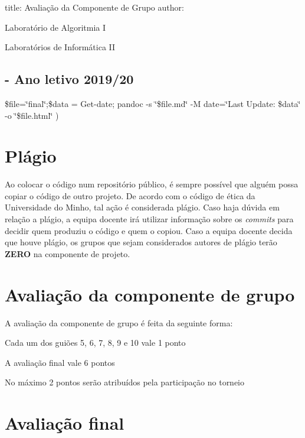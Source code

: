 

 title\+: Avaliação da Componente de Grupo author\+:
\begin{DoxyItemize}
\item Laboratório de Algoritmia I
\item Laboratórios de Informática II \subsection*{-\/ Ano letivo 2019/20 }
\end{DoxyItemize}

\$file=\char`\"{}final\char`\"{};\$data = Get-\/date; pandoc -\/s \char`\"{}\$file.\+md\char`\"{} -\/M date=\char`\"{}\+Last Update\+: \$data\char`\"{} -\/o \char`\"{}\$file.\+html\char`\"{} )

\section*{Plágio}

Ao colocar o código num repositório público, é sempre possível que alguém possa copiar o código de outro projeto. De acordo com o código de ética da Universidade do Minho, tal ação é considerada plágio. Caso haja dúvida em relação a plágio, a equipa docente irá utilizar informação sobre os {\itshape commits} para decidir quem produziu o código e quem o copiou. Caso a equipa docente decida que houve plágio, os grupos que sejam considerados autores de plágio terão {\bfseries Z\+E\+RO} na componente de projeto.

\section*{Avaliação da componente de grupo}

A avaliação da componente de grupo é feita da seguinte forma\+:


\begin{DoxyItemize}
\item Cada um dos guiões 5, 6, 7, 8, 9 e 10 vale 1 ponto
\item A avaliação final vale 6 pontos
\item No máximo 2 pontos serão atribuídos pela participação no torneio
\end{DoxyItemize}

\section*{Avaliação final}

